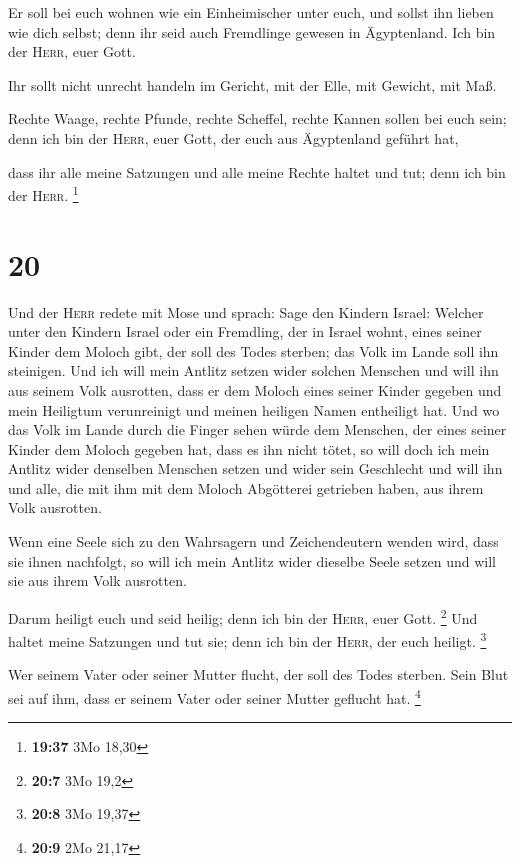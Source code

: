  Er soll bei euch wohnen wie ein Einheimischer unter
euch, und sollst ihn lieben wie dich selbst; denn ihr seid auch
Fremdlinge gewesen in Ägyptenland. Ich bin der \textsc{Herr}, euer Gott.

 Ihr sollt nicht unrecht handeln im Gericht, mit der
Elle, mit Gewicht, mit Maß.

 Rechte Waage, rechte Pfunde, rechte Scheffel, rechte
Kannen sollen bei euch sein; denn ich bin der \textsc{Herr}, euer Gott,
der euch aus Ägyptenland geführt hat,

 dass ihr alle meine Satzungen und alle meine Rechte
haltet und tut; denn ich bin der \textsc{Herr}. \footnote{\textbf{19:37}
  3Mo 18,30}

\hypertarget{section-4}{%
\section{20}\label{section-4}}

 Und der \textsc{Herr} redete mit Mose und sprach:
 Sage den Kindern Israel: Welcher unter den Kindern Israel
oder ein Fremdling, der in Israel wohnt, eines seiner Kinder dem Moloch
gibt, der soll des Todes sterben; das Volk im Lande soll ihn steinigen.
 Und ich will mein Antlitz setzen wider solchen Menschen
und will ihn aus seinem Volk ausrotten, dass er dem Moloch eines seiner
Kinder gegeben und mein Heiligtum verunreinigt und meinen heiligen Namen
entheiligt hat.  Und wo das Volk im Lande durch die Finger
sehen würde dem Menschen, der eines seiner Kinder dem Moloch gegeben
hat, dass es ihn nicht tötet,  so will doch ich mein
Antlitz wider denselben Menschen setzen und wider sein Geschlecht und
will ihn und alle, die mit ihm mit dem Moloch Abgötterei getrieben
haben, aus ihrem Volk ausrotten.

 Wenn eine Seele sich zu den Wahrsagern und Zeichendeutern
wenden wird, dass sie ihnen nachfolgt, so will ich mein Antlitz wider
dieselbe Seele setzen und will sie aus ihrem Volk ausrotten.

 Darum heiligt euch und seid heilig; denn ich bin der
\textsc{Herr}, euer Gott. \footnote{\textbf{20:7} 3Mo 19,2}
 Und haltet meine Satzungen und tut sie; denn ich bin der
\textsc{Herr}, der euch heiligt. \footnote{\textbf{20:8} 3Mo 19,37}

 Wer seinem Vater oder seiner Mutter flucht, der soll des
Todes sterben. Sein Blut sei auf ihm, dass er seinem Vater oder seiner
Mutter geflucht hat. \footnote{\textbf{20:9} 2Mo 21,17}

